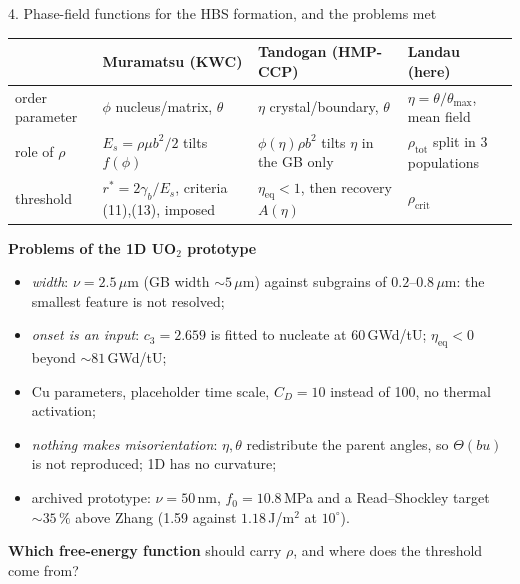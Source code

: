\documentclass[10pt,aspectratio=169]{beamer}
\begin{document}
\begin{frame}{4. Phase-field functions for the HBS formation, and the problems met}
  \scriptsize
  \begin{tabular}{p{}p{}p{}p{}}
    \toprule
     & Muramatsu (KWC) & Tandogan (HMP-CCP) & Landau (here) \\
    \midrule
    order parameter & $\phi$ nucleus/matrix, $\theta$ & $\eta$ crystal/boundary, $\theta$ & $\eta=\theta/\theta_{\max}$, mean field \\
    role of $\rho$ & $E_s=\rho\mu b^2/2$ tilts $f(\phi)$ & $\phi(\eta)\rho b^2$ tilts $\eta$ in the GB only & $\rho_{\text{tot}}$ split in 3 populations \\
    threshold & $r^*=2\gamma_b/E_s$, criteria (11),(13), imposed & $\eta_{\text{eq}}<1$, then recovery $A(\eta)$ & $\rho_{\text{crit}}$ \\
    \bottomrule
  \end{tabular}

  \vspace{0.4em}
  \footnotesize
  \textbf{Problems of the 1D UO$_2$ prototype}
  \begin{itemize}
    \item \emph{width}: $\nu=2.5\,\mu$m (GB width $\sim5\,\mu$m) against subgrains of $0.2$--$0.8\,\mu$m: the smallest feature is not resolved;
    \item \emph{onset is an input}: $c_3 = 2.659$ is fitted to nucleate at 60\,GWd/tU; $\eta_{\text{eq}}<0$ beyond $\sim81$\,GWd/tU;
    \item Cu parameters, placeholder time scale, $C_D=10$ instead of 100, no thermal activation;
    \item \emph{nothing makes misorientation}: $\eta,\theta$ redistribute the parent angles, so $\Theta(bu)$ is not reproduced; 1D has no curvature;
    \item archived prototype: $\nu=50$\,nm, $f_0=10.8$\,MPa and a Read--Shockley target $\sim35\,\%$ above Zhang (1.59 against $1.18$\,J/m$^2$ at $10^\circ$).
  \end{itemize}
  \textbf{Which free-energy function} should carry $\rho$, and where does the threshold come from?
\end{frame}



\appendix
\end{document}
